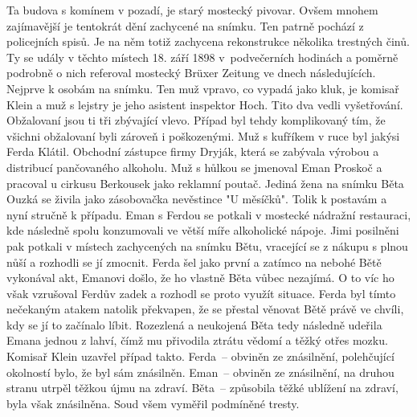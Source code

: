 
Ta budova s komínem v pozadí, je starý mostecký pivovar. Ovšem mnohem
zajímavější je tentokrát dění zachycené na snímku. Ten patrně pochází
z policejních spisů. Je na něm totiž zachycena rekonstrukce několika
trestných činů. Ty se udály v těchto místech 18. září 1898
v~podvečerních hodinách a poměrně podrobně o nich referoval mostecký
Brüxer Zeitung ve dnech následujících. Nejprve k osobám na snímku. Ten
muž vpravo, co vypadá jako kluk, je komisař Klein a muž s lejstry je
jeho asistent inspektor Hoch. Tito dva vedli vyšetřování. Obžalovaní
jsou ti tři zbývající vlevo. Případ byl tehdy komplikovaný tím, že
všichni obžalovaní byli zároveň i poškozenými. Muž s kufříkem v ruce
byl jakýsi Ferda Klátil. Obchodní zástupce firmy Dryják, která se
zabývala výrobou a distribucí pančovaného alkoholu. Muž s hůlkou se
jmenoval Eman Proskoč a pracoval u cirkusu Berkousek jako reklamní
poutač. Jediná žena na snímku Běta Ouzká se živila jako zásobovačka
nevěstince "U měsíčků". Tolik k postavám a nyní stručně k případu.
Eman s Ferdou se potkali v mostecké nádražní restauraci, kde následně
spolu konzumovali ve větší míře alkoholické nápoje. Jimi posilněni pak
potkali v místech zachycených na snímku Bětu, vracející se z nákupu s
plnou nůší a rozhodli se jí zmocnit. Ferda šel jako první a zatímco na
nebohé Bětě vykonával akt, Emanovi došlo, že ho vlastně Běta vůbec
nezajímá. O to víc ho však vzrušoval Ferdův zadek a rozhodl se proto
využít situace. Ferda byl tímto nečekaným atakem natolik překvapen, že
se přestal věnovat Bětě právě ve chvíli, kdy se jí to začínalo líbit.
Rozezlená a neukojená Běta tedy následně udeřila Emana jednou z lahví,
čímž mu přivodila ztrátu vědomí a těžký otřes mozku. Komisař Klein
uzavřel případ takto. Ferda~-- obviněn ze znásilnění, polehčující
okolností bylo, že byl sám znásilněn. Eman~-- obviněn ze znásilnění,
na druhou stranu utrpěl těžkou újmu na zdraví. Běta~-- způsobila těžké
ublížení na zdraví, byla však znásilněna. Soud všem vyměřil podmíněné
tresty.
